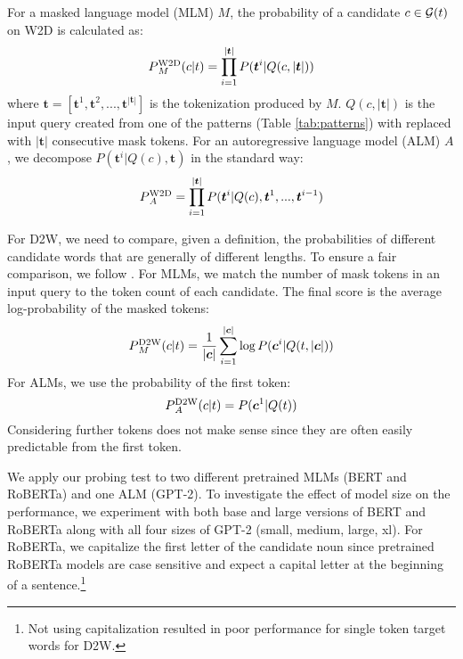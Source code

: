 \documentclass[11pt,a4paper]{article}
\def\uprm#1#2{\mbox{$_#2^{\hbox{\scriptsize #1}}$}}
\begin{document}

For a masked language model (MLM)
$M$, the probability of a candidate $c \in {\cal G}(t)$ on W2D  is calculated as:
\begin{equation*}
  P\uprm{W2D}{M} (c|t) = \prod_{i=1}^{|\bm{t}|}P(\bm{t}^i|Q(c,|\bm{t}|))
\end{equation*}
where $\bm{t} = [\bm{t}^1, \bm{t}^2,...,\bm{t}^{|\bm{t}|}]$
is the tokenization produced by  $M$. $Q(c,|\bm{t}|)$ is the
input query
created from one of the patterns (Table \ref{tab:patterns})
with \underline{\hspace{3mm}} replaced with
$|\bm{t}|$ consecutive mask tokens. For an autoregressive
language model (ALM) $A$, we
decompose $P(\bm{t}^i|Q(c),\bm{t})$ in the standard way:
\begin{equation*}
    P\uprm{W2D}{A} = \prod_{i=1}^{|\bm{t}|}P(\bm{t}^i|Q(c),\bm{t}^{1},...,\bm{t}^{i-1})
\end{equation*}

For D2W, we need to compare, given a definition, the probabilities of
different candidate words that are generally of different lengths.
To ensure a fair comparison,
we follow
. For MLMs, we
match the number of mask tokens in an input query to the
token count of each candidate. The final score is the average log-probability of the masked tokens:
\begin{equation*}
    P\uprm{D2W}{M}(c|t) =
    \frac{1}{|\bm{c}|}\sum_{i=1}^{|\bm{c}|}\log P(\bm{c}^i |
    Q(t,|\bm{c}|))
\end{equation*}
For ALMs, we use the probability of
the first token:
\begin{equation*}
    P\uprm{D2W}{A}(c|t) =
     P(\bm{c}^1 |
    Q(t))
\end{equation*}
Considering further tokens does not make sense since they
are often easily predictable from the first token.


We apply our probing test to two different pretrained
MLMs (BERT and
RoBERTa) and one ALM
(GPT-2). 
To investigate the effect of model
size on the performance, we experiment with both
base and large versions of BERT and RoBERTa
along with all four sizes of GPT-2 (small, medium,
large, xl). 
For RoBERTa, we capitalize the first letter of the candidate
noun since pretrained RoBERTa models are case sensitive
and expect a capital letter at the beginning of a
sentence.\footnote{Not using capitalization resulted in poor performance for single token target words for D2W.}
\end{document}
